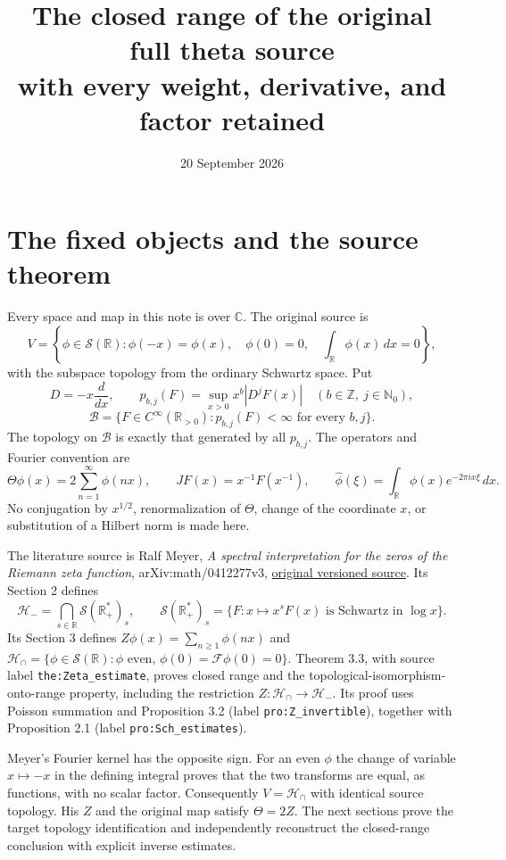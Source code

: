 \documentclass[11pt]{article}
\title{The closed range of the original full theta source\\
with every weight, derivative, and factor retained}
\author{}
\date{20 September 2026}
\newcommand{\B}{\mathscr B}
\newcommand{\Sch}{\mathcal S}
\newcommand{\HH}{\mathcal H}
\newcommand{\Z}{\mathbb Z}
\newcommand{\R}{\mathbb R}
\newcommand{\C}{\mathbb C}
\newcommand{\N}{\mathbb N}
\newcommand{\F}{\mathcal F}
\begin{document}
\maketitle

\section{The fixed objects and the source theorem}

Every space and map in this note is over $\C$. The original source is
\[
 V=\left\{\phi\in\Sch(\R):\phi(-x)=\phi(x),\quad
       \phi(0)=0,\quad \int_\R\phi(x)\,dx=0\right\},
\]
with the subspace topology from the ordinary Schwartz space. Put
\[
 D=-x\frac{d}{dx},\qquad
 p_{b,j}(F)=\sup_{x>0}x^b|D^jF(x)|\quad(b\in\Z,\ j\in\N_0),
\]
\[
 \B=\{F\in C^\infty(\R_{>0}):p_{b,j}(F)<\infty
                     \text{ for every }b,j\}.
\]
The topology on $\B$ is exactly that generated by all $p_{b,j}$. The
operators and Fourier convention are
\begin{equation}\label{eq:original}
 \Theta\phi(x)=2\sum_{n=1}^{\infty}\phi(nx),\qquad
 JF(x)=x^{-1}F(x^{-1}),\qquad
 \widehat\phi(\xi)=\int_\R\phi(x)e^{-2\pi i x\xi}\,dx.
\end{equation}
No conjugation by $x^{1/2}$, renormalization of $\Theta$, change of the
coordinate $x$, or substitution of a Hilbert norm is made here.

The literature source is Ralf Meyer, \emph{A spectral interpretation for
the zeros of the Riemann zeta function}, arXiv:math/0412277v3,
\href{https://arxiv.org/abs/math/0412277v3}{original versioned source}.
Its Section 2 defines
\[
 \HH_- =\bigcap_{s\in\R}\Sch(\R_+^*)_s,\qquad
 \Sch(\R_+^*)_s=
 \{F:x\mapsto x^sF(x)\text{ is Schwartz in }\log x\}.
\]
Its Section 3 defines $Z\phi(x)=\sum_{n\geq1}\phi(nx)$ and
$\HH_\cap=\{\phi\in\Sch(\R):\phi\text{ even},\,
\phi(0)=\F\phi(0)=0\}$. Theorem 3.3, with source label
\texttt{the:Zeta\_estimate}, proves closed range and the
topological-isomorphism-onto-range property, including the restriction
$Z:\HH_\cap\to\HH_-$. Its proof uses Poisson summation and
Proposition 3.2 (label \texttt{pro:Z\_invertible}), together with
Proposition 2.1 (label \texttt{pro:Sch\_estimates}).

Meyer's Fourier kernel has the opposite sign. For an even $\phi$ the
change of variable $x\mapsto-x$ in the defining integral proves that
the two transforms are equal, as functions, with no scalar factor.
Consequently $V=\HH_\cap$ with identical source topology. His $Z$ and
the original map satisfy $\Theta=2Z$. The next sections prove the target
topology identification and independently reconstruct the closed-range
conclusion with explicit inverse estimates.
\end{document}
